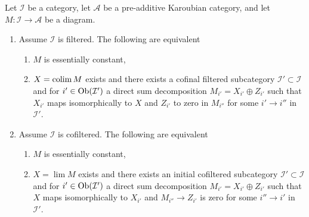 \begin{lemma}
\label{lemma-essentially-constant-into-karoubian}
Let $\mathcal{I}$ be a category, let $\mathcal{A}$ be a pre-additive
Karoubian category, and let $M : \mathcal{I} \to \mathcal{A}$ be a diagram.
\begin{enumerate}
\item Assume $\mathcal{I}$ is filtered. The following are equivalent
\begin{enumerate}
\item $M$ is essentially constant,
\item $X = \mathop{\mathrm{colim}}\nolimits M$ exists and there exists a cofinal filtered subcategory
$\mathcal{I}' \subset \mathcal{I}$ and for $i' \in \mathop{\mathrm{Ob}}\nolimits(\mathcal{I}')$
a direct sum decomposition $M_{i'} = X_{i'} \oplus Z_{i'}$ such that
$X_{i'}$ maps isomorphically to $X$ and $Z_{i'}$ to zero in $M_{i''}$
for some $i' \to i''$ in $\mathcal{I}'$.
\end{enumerate}
\item Assume $\mathcal{I}$ is cofiltered. The following are equivalent
\begin{enumerate}
\item $M$ is essentially constant,
\item $X = \lim M$ exists and there exists an initial cofiltered subcategory
$\mathcal{I}' \subset \mathcal{I}$ and for $i' \in \mathop{\mathrm{Ob}}\nolimits(\mathcal{I}')$
a direct sum decomposition $M_{i'} = X_{i'} \oplus Z_{i'}$
such that $X$ maps isomorphically to $X_{i'}$ and $M_{i''} \to Z_{i'}$
is zero for some $i'' \to i'$ in $\mathcal{I}'$.
\end{enumerate}
\end{enumerate}
\end{lemma}

